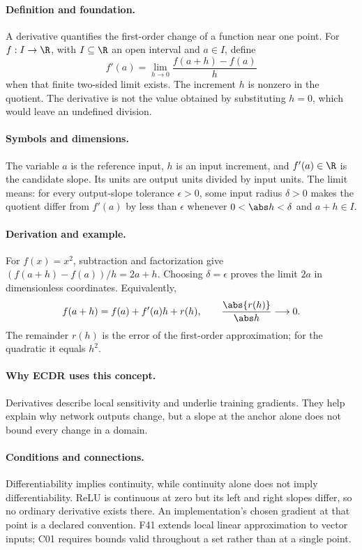 \paragraph{Definition and foundation.}
A derivative quantifies the first-order change of a function near one point. For $f:I\to\R$, with $I\subseteq\R$ an open interval and $a\in I$, define
\[
 f'(a)=\lim_{h\to0}\frac{f(a+h)-f(a)}h
\]
when that finite two-sided limit exists. The increment $h$ is nonzero in the quotient. The derivative is not the value obtained by substituting $h=0$, which would leave an undefined division.
\paragraph{Symbols and dimensions.}
The variable $a$ is the reference input, $h$ is an input increment, and $f'(a)\in\R$ is the candidate slope. Its units are output units divided by input units. The limit means: for every output-slope tolerance $\epsilon>0$, some input radius $\delta>0$ makes the quotient differ from $f'(a)$ by less than $\epsilon$ whenever $0<\abs h<\delta$ and $a+h\in I$.
\paragraph{Derivation and example.}
For $f(x)=x^2$, subtraction and factorization give $(f(a+h)-f(a))/h=2a+h$. Choosing $\delta=\epsilon$ proves the limit $2a$ in dimensionless coordinates. Equivalently,
\[
 f(a+h)=f(a)+f'(a)h+r(h),\qquad
 \frac{\abs{r(h)}}{\abs h}\longrightarrow0.
\]
The remainder $r(h)$ is the error of the first-order approximation; for the quadratic it equals $h^2$.
\paragraph{Why ECDR uses this concept.}
Derivatives describe local sensitivity and underlie training gradients. They help explain why network outputs change, but a slope at the anchor alone does not bound every change in a domain.
\paragraph{Conditions and connections.}
Differentiability implies continuity, while continuity alone does not imply differentiability. ReLU is continuous at zero but its left and right slopes differ, so no ordinary derivative exists there. An implementation's chosen gradient at that point is a declared convention. F41 extends local linear approximation to vector inputs; C01 requires bounds valid throughout a set rather than at a single point.


